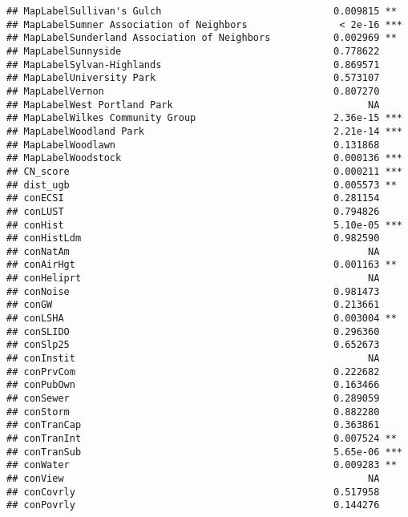 \documentclass[]{article}
\begin{document}
\begin{verbatim}
## MapLabelSullivan's Gulch                              0.009815 ** 
## MapLabelSumner Association of Neighbors                < 2e-16 ***
## MapLabelSunderland Association of Neighbors           0.002969 ** 
## MapLabelSunnyside                                     0.778622    
## MapLabelSylvan-Highlands                              0.869571    
## MapLabelUniversity Park                               0.573107    
## MapLabelVernon                                        0.807270    
## MapLabelWest Portland Park                                  NA    
## MapLabelWilkes Community Group                        2.36e-15 ***
## MapLabelWoodland Park                                 2.21e-14 ***
## MapLabelWoodlawn                                      0.131868    
## MapLabelWoodstock                                     0.000136 ***
## CN_score                                              0.000211 ***
## dist_ugb                                              0.005573 ** 
## conECSI                                               0.281154    
## conLUST                                               0.794826    
## conHist                                               5.10e-05 ***
## conHistLdm                                            0.982590    
## conNatAm                                                    NA    
## conAirHgt                                             0.001163 ** 
## conHeliprt                                                  NA    
## conNoise                                              0.981473    
## conGW                                                 0.213661    
## conLSHA                                               0.003004 ** 
## conSLIDO                                              0.296360    
## conSlp25                                              0.652673    
## conInstit                                                   NA    
## conPrvCom                                             0.222682    
## conPubOwn                                             0.163466    
## conSewer                                              0.289059    
## conStorm                                              0.882280    
## conTranCap                                            0.363861    
## conTranInt                                            0.007524 ** 
## conTranSub                                            5.65e-06 ***
## conWater                                              0.009283 ** 
## conView                                                     NA    
## conCovrly                                             0.517958    
## conPovrly                                             0.144276    

\end{verbatim}
\end{document}
